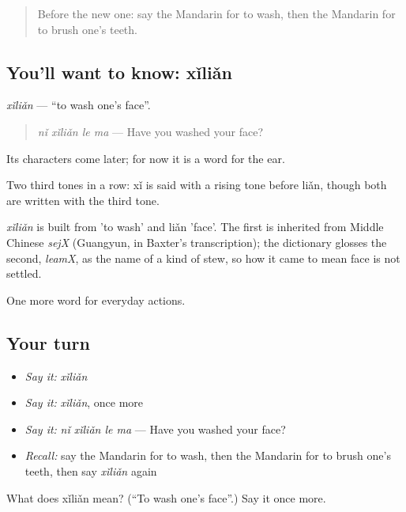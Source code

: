 \begin{quote}
Before the new one: say the Mandarin for to wash, then the Mandarin for to brush one's teeth.
\end{quote}

\subsection*{You'll want to know: xǐliǎn}
\emph{xǐliǎn} — \textquotedblleft{}to wash one's face\textquotedblright{}.

\begin{quote}
\emph{nǐ xǐliǎn le ma} — Have you washed your face?
\end{quote}

Its characters come later; for now it is a word for the ear.

Two third tones in a row: xǐ is said with a rising tone before liǎn, though both are written with the third tone.

\begin{cousinweb}
\emph{xǐliǎn} is built from  'to wash' and liǎn 'face'. The first is inherited from Middle Chinese \emph{sejX} (Guangyun, in Baxter's transcription); the dictionary glosses the second, \emph{leamX}, as the name of a kind of stew, so how it came to mean face is not settled.
\end{cousinweb}

\begin{grammarlens}[title={What you've built}]
One more word for everyday actions.
\end{grammarlens}

\subsection*{Your turn}
\begin{itemize}
\raggedright
  \item \emph{Say it:} \emph{xǐliǎn}
  \item \emph{Say it:} \emph{xǐliǎn}, once more
  \item \emph{Say it:} \emph{nǐ xǐliǎn le ma} — Have you washed your face?
  \item \emph{Recall:} say the Mandarin for to wash, then the Mandarin for to brush one's teeth, then say \emph{xǐliǎn} again
\end{itemize}

\begin{tcolorbox}[breakable,colback=teal!4,colframe=teal!35!black,title={Before you move on}]
What does xǐliǎn mean? (\textquotedblleft{}To wash one's face\textquotedblright{}.) Say it once more.
\end{tcolorbox}
